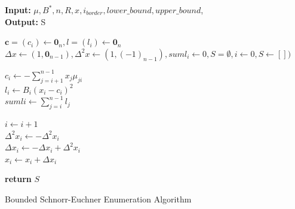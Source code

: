 \begin{algorithm}[h] \label{bounded}
\SetAlgoLined

{\bf Input:} $μ, Β^*, n, R, x, i_{border}, lower\_bound, upper\_bound $,  \\
{\bf Output:} S \\

\hfill

$ \bm c = (c_i) \gets \bm 0_n, l = (l_i) \gets \bm 0_n $ \\
$ Δx \gets (1, \bm 0_{n-1}), Δ^2x \gets(1,(-1)_{n-1}), suml_i \gets 0, S = \emptyset, i \gets 0, S \gets []) $ \\

 { 

    $ c_i \gets - \sum_{j=i+1}^{n-1} x_jμ_{ji}$ \\
    $ l_i \gets B_i(x_i - c_i)^2 $ \\
    $ sumli \gets \sum_{j=i}^{n-1}l_j $ \\
    
    {
    {
    $ i \gets i + 1 $ \\
    $ Δ^2x_i \gets - Δ^2x_i $ \\
    $ Δx_i \gets -Δx_i +Δ^2x_i $ \\
    $ x_i \gets x_i + Δx_i $ \\
    
    }
    
    }

} %
\textbf{return} $ S $

\caption{Bounded Schnorr-Euchner Enumeration Algorithm}
\end{algorithm}
